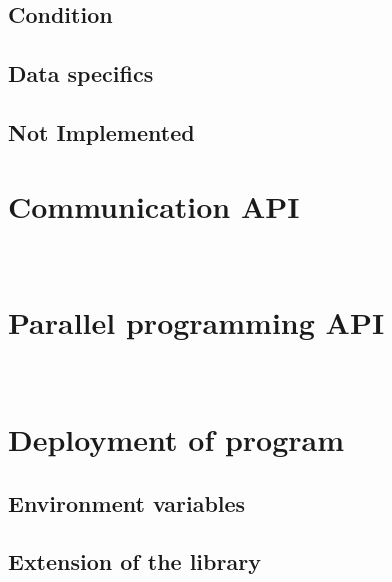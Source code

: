 \documentclass{report}
\begin{document}


\subsection{Condition}



\subsection{Data specifics}

\subsection{Not Implemented}

\section{Communication API}\label{comapi}
\\

\section{Parallel programming API}
\\

\section{Deployment of program}

\subsection{Environment variables}\label{envvar}

\subsection{Extension of the library}
\end{document}
